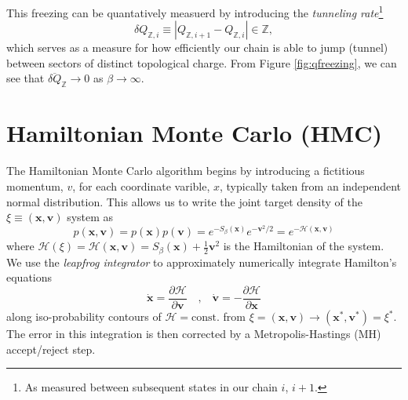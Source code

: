 \documentclass[a4paper,11pt]{article}
\newcommand{\x}{\mathbf{x}}
\newcommand{\p}{\mathbf{v}}
\begin{document}
This freezing can be quantatively measuerd by introducing the
\emph{tunneling rate}\footnote{As measured
between subsequent states in our chain \(i\), \(i+1\).}
%
\begin{equation}
  \delta Q_{\mathbb{Z},i} \equiv \left|Q_{\mathbb{Z},i+1} - Q_{\mathbb{Z},i}\right|
    \in \mathbb{Z},
\end{equation}
%
which serves as a measure for how efficiently our chain is able to jump
(tunnel) between sectors of distinct topological charge.
%
From Figure \ref{fig:qfreezing}, we can see that
\(\overline{\delta Q}_{\mathbb{Z}} \rightarrow 0\) as
\(\beta\rightarrow \infty\).
%
\section{\label{sec:hmc}Hamiltonian Monte Carlo (HMC)}
%
The Hamiltonian Monte Carlo algorithm begins by introducing a fictitious
momentum, \(v\), for each coordinate varible, $x$, typically taken
from an independent normal distribution.
%
This allows us to write the joint target density of the \(\xi \equiv (\x, \p)\)
system as
%
\begin{equation}
    p(\x, \p) = p(\x) p(\p) = e^{-S_{\beta}(\x)} e^{-\p^2 / 2} = e^{-\mathcal{H} (\x, \p)}
\end{equation}
%
where \(\mathcal{H}(\xi) = \mathcal{H}(\x, \p) = S_{\beta}(\x) + \frac{1}{2} \p^2
\) is the Hamiltonian of the system.
%
We use the \emph{leapfrog integrator} to approximately numerically integrate Hamilton's
equations
%
\begin{equation}
    \dot{\x} = \frac{\partial \mathcal{H}}{\partial \p}\quad \text{,} \quad
    \dot{\p} = - \frac{\partial \mathcal{H}}{\partial \x}
\end{equation}
%
along iso-probability contours of \(\mathcal{H} =\text{const.}\)
from \(\xi = (\x,\p)\rightarrow (\x^{\ast}, \p^{\ast}) = \xi^{\ast}\).
The error in this integration is then corrected by a Metropolis-Hastings (MH)
accept/reject step.
%
\end{document}
